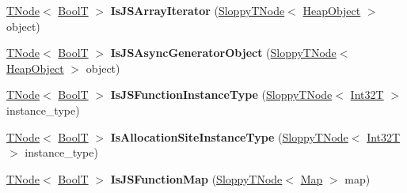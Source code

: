 \begin{DoxyCompactItemize}
\item 
\mbox{\label{classv8_1_1internal_1_1CodeStubAssembler_a17f363ffddad3634c3131136c2128be5}} 
\mbox{\hyperlink{classv8_1_1internal_1_1compiler_1_1TNode}{T\+Node}}$<$ \mbox{\hyperlink{structv8_1_1internal_1_1BoolT}{BoolT}} $>$ {\bfseries Is\+J\+S\+Array\+Iterator} (\mbox{\hyperlink{classv8_1_1internal_1_1compiler_1_1SloppyTNode}{Sloppy\+T\+Node}}$<$ \mbox{\hyperlink{classv8_1_1internal_1_1HeapObject}{Heap\+Object}} $>$ object)
\item 
\mbox{\label{classv8_1_1internal_1_1CodeStubAssembler_a1d7ce6367b2e1de334d26d63552ceebb}} 
\mbox{\hyperlink{classv8_1_1internal_1_1compiler_1_1TNode}{T\+Node}}$<$ \mbox{\hyperlink{structv8_1_1internal_1_1BoolT}{BoolT}} $>$ {\bfseries Is\+J\+S\+Async\+Generator\+Object} (\mbox{\hyperlink{classv8_1_1internal_1_1compiler_1_1SloppyTNode}{Sloppy\+T\+Node}}$<$ \mbox{\hyperlink{classv8_1_1internal_1_1HeapObject}{Heap\+Object}} $>$ object)
\item 
\mbox{\label{classv8_1_1internal_1_1CodeStubAssembler_acd5ad71444212d01b347fcfd4efc4a8b}} 
\mbox{\hyperlink{classv8_1_1internal_1_1compiler_1_1TNode}{T\+Node}}$<$ \mbox{\hyperlink{structv8_1_1internal_1_1BoolT}{BoolT}} $>$ {\bfseries Is\+J\+S\+Function\+Instance\+Type} (\mbox{\hyperlink{classv8_1_1internal_1_1compiler_1_1SloppyTNode}{Sloppy\+T\+Node}}$<$ \mbox{\hyperlink{structv8_1_1internal_1_1Int32T}{Int32T}} $>$ instance\+\_\+type)
\item 
\mbox{\label{classv8_1_1internal_1_1CodeStubAssembler_a8a46bdf37d75de53fe79f98f34d9e4b8}} 
\mbox{\hyperlink{classv8_1_1internal_1_1compiler_1_1TNode}{T\+Node}}$<$ \mbox{\hyperlink{structv8_1_1internal_1_1BoolT}{BoolT}} $>$ {\bfseries Is\+Allocation\+Site\+Instance\+Type} (\mbox{\hyperlink{classv8_1_1internal_1_1compiler_1_1SloppyTNode}{Sloppy\+T\+Node}}$<$ \mbox{\hyperlink{structv8_1_1internal_1_1Int32T}{Int32T}} $>$ instance\+\_\+type)
\item 
\mbox{\label{classv8_1_1internal_1_1CodeStubAssembler_aa155ab7421dea215f3f14ca838b2f7ff}} 
\mbox{\hyperlink{classv8_1_1internal_1_1compiler_1_1TNode}{T\+Node}}$<$ \mbox{\hyperlink{structv8_1_1internal_1_1BoolT}{BoolT}} $>$ {\bfseries Is\+J\+S\+Function\+Map} (\mbox{\hyperlink{classv8_1_1internal_1_1compiler_1_1SloppyTNode}{Sloppy\+T\+Node}}$<$ \mbox{\hyperlink{classv8_1_1internal_1_1Map}{Map}} $>$ map)

\end{DoxyCompactItemize}
